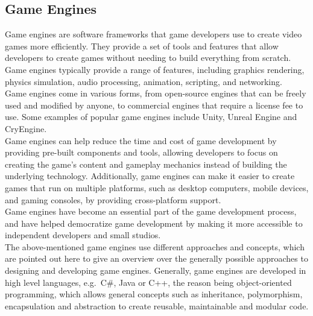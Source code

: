 \subsection{Game Engines}\label{subsec:game-engines}
Game engines are software frameworks that game developers use to create video games more efficiently.
They provide a set of tools and features that allow developers to create games without needing to build everything from scratch.
Game engines typically provide a range of features, including graphics rendering, physics simulation, audio processing, animation, scripting, and networking.
\\
Game engines come in various forms, from open-source engines that can be freely used and modified by anyone, to commercial engines that require a license fee to use.
Some examples of popular game engines include Unity, Unreal Engine and CryEngine.
\\
Game engines can help reduce the time and cost of game development by providing pre-built components and tools, allowing developers to focus on creating the game's content and gameplay mechanics instead of building the underlying technology.
Additionally, game engines can make it easier to create games that run on multiple platforms, such as desktop computers, mobile devices, and gaming consoles, by providing cross-platform support.
\\
Game engines have become an essential part of the game development process, and have helped democratize game development by making it more accessible to independent developers and small studios.
\\
The above-mentioned game engines use different approaches and concepts, which are pointed out here to give an overview over the generally possible approaches to
designing and developing game engines.
Generally, game engines are developed in high level languages, e.g.~C\#, Java or C++, the reason being object-oriented programming,
which allows general concepts such as inheritance, polymorphism, encapsulation and abstraction to create reusable, maintainable and modular code.
\\
